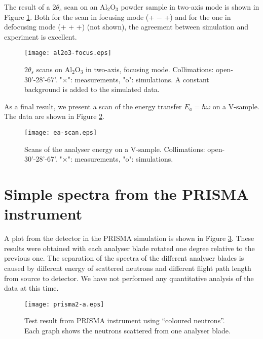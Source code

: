 The result of a $2\theta_s$ scan on an Al$_2$O$_3$
powder sample in two-axis mode is shown in Figure \ref{f:al2o3}.
Both for the scan in focusing mode (+ $-$ +)
and for the one in defocusing mode (+ + +) (not shown),
the agreement between simulation and experiment is excellent.

\begin{figure}
  \begin{center}
    \texttt{[image: al2o3-focus.eps]}
  \end{center}
\caption{$2\theta_s$ scans on Al$_2$O$_3$ in two-axis, focusing mode.
Collimations: open-30'-28'-67'.
"$\times$": measurements, "o": simulations.  
A constant background is added to the simulated data.}
\label{f:al2o3}
\end{figure}

As a final result, we present a scan of the energy
transfer $E_a = \hbar \omega$ on a V-sample.
The data are shown in Figure \ref{f:v_ea}.

\begin{figure}
  \begin{center}
    \texttt{[image: ea-scan.eps]}
  \end{center}
\caption{Scans of the analyser energy on a V-sample.
Collimations: open-30'-28'-67'.
"$\times$": measurements, "o": simulations.}
\label{f:v_ea}
\end{figure}


\section{Simple spectra from the PRISMA instrument}
\label{data:PRISMA}

A plot from the detector in the PRISMA simulation is shown in Figure
\ref{f:PRISMAdata}. These results were obtained with each analyser blade
rotated one degree relative to the previous one. The separation of the
spectra of the different analyser blades is caused by different energy
of scattered neutrons and different flight path length from source to
detector.  We have not performed any quantitative analysis of the data at this
time.

\begin{figure}
  \begin{center}
    \texttt{[image: prisma2-a.eps]}
  \end{center}
\caption{Test result from PRISMA instrument using ``coloured
  neutrons''. Each graph shows the neutrons scattered from one analyser blade.}
\label{f:PRISMAdata}
\end{figure}


